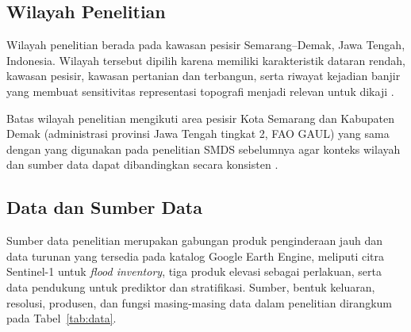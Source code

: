 \documentclass[12pt]{article}
\begin{document}
\subsection{Wilayah Penelitian}

Wilayah penelitian berada pada kawasan pesisir Semarang--Demak, Jawa Tengah,
Indonesia. Wilayah tersebut dipilih karena memiliki karakteristik dataran
rendah, kawasan pesisir, kawasan pertanian dan terbangun, serta riwayat
kejadian banjir yang membuat sensitivitas representasi topografi menjadi
relevan untuk dikaji \cite{marfai2008,Husnayaen2018,Sakina2025}.

Batas wilayah penelitian mengikuti area pesisir Kota Semarang dan Kabupaten
Demak (administrasi provinsi Jawa Tengah tingkat 2, FAO GAUL) yang sama
dengan yang digunakan pada penelitian SMDS sebelumnya agar konteks
wilayah dan sumber data dapat dibandingkan secara konsisten
\cite{hakim2026}.

\subsection{Data dan Sumber Data}

Sumber data penelitian merupakan gabungan produk penginderaan jauh dan data
turunan yang tersedia pada katalog Google Earth Engine, meliputi citra
Sentinel-1 untuk \textit{flood inventory}, tiga produk elevasi sebagai
perlakuan, serta data pendukung untuk prediktor dan stratifikasi. Sumber,
bentuk keluaran, resolusi, produsen, dan fungsi masing-masing data dalam
penelitian dirangkum pada Tabel~\ref{tab:data}.
\end{document}
